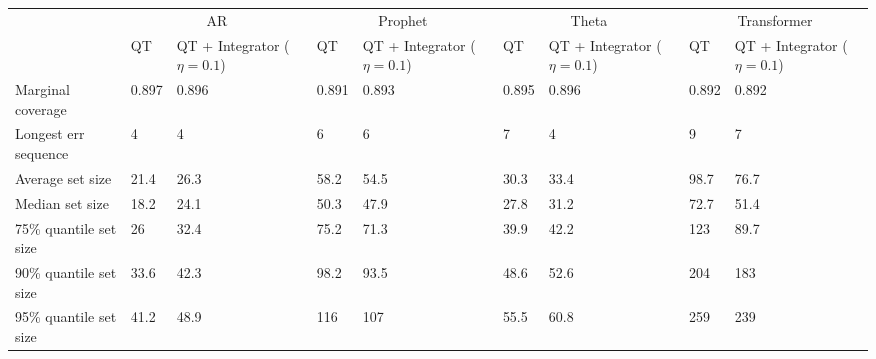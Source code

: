 \begin{tabular}{lllllllll}
\toprule
& \multicolumn{2}{c}{AR}& \multicolumn{2}{c}{Prophet}& \multicolumn{2}{c}{Theta}& \multicolumn{2}{c}{Transformer} \\
& QT & QT + Integrator ($\eta=0.1$) & QT & QT + Integrator ($\eta=0.1$) & QT & QT + Integrator ($\eta=0.1$) & QT & QT + Integrator ($\eta=0.1$) \\
\midrule
Marginal coverage & 0.897 & 0.896 & 0.891 & 0.893 & 0.895 & 0.896 & 0.892 & 0.892 \\
Longest err sequence & 4 & 4 & 6 & 6 & 7 & 4 & 9 & 7 \\
Average set size & 21.4 & 26.3 & 58.2 & 54.5 & 30.3 & 33.4 & 98.7 & 76.7 \\
Median set size & 18.2 & 24.1 & 50.3 & 47.9 & 27.8 & 31.2 & 72.7 & 51.4 \\
75\% quantile set size & 26 & 32.4 & 75.2 & 71.3 & 39.9 & 42.2 & 123 & 89.7 \\
90\% quantile set size & 33.6 & 42.3 & 98.2 & 93.5 & 48.6 & 52.6 & 204 & 183 \\
95\% quantile set size & 41.2 & 48.9 & 116 & 107 & 55.5 & 60.8 & 259 & 239 \\
\bottomrule
\end{tabular}
